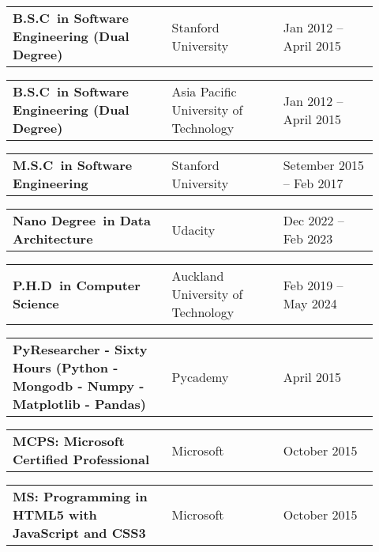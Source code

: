 \documentclass[10pt,a4paper,ragged2e,withhyper]{altacv}
\renewcommand{\cvevent}[4]{%
  \textbf{#1} %
  \hfill %
  \begin{minipage}[t]{.5\linewidth}
    \raggedleft %
    \small#3 %
    \\ %
    #4 %
  \end{minipage}
  \vspace{\baselineskip} %
}
\begin{document}
\vspace{0.5cm}


\renewcommand{\cvevent}[4]{%
  \noindent
  \begin{tabular}{@{}p{0.4\linewidth}p{0.28\linewidth}p{0.2433\linewidth}@{}}
    \small\textbf{#1} & %
    \small{#2} & %
    \raggedleft\arraybackslash\small{#3} %
  \end{tabular}
  \par %
  \vspace{0.5em} %
}








\cvevent{B.S.C\ in Software Engineering (Dual Degree)}{Stanford University}{Jan 2012 -- April 2015}{}

\divider

\cvevent{B.S.C\ in Software Engineering (Dual Degree)}{Asia Pacific University of Technology}{Jan 2012 -- April 2015}{}

\divider

\cvevent{M.S.C\ in Software Engineering}{Stanford University}{Setember 2015 -- Feb 2017}{}

\divider

\cvevent{Nano Degree\ in Data Architecture}{Udacity}{Dec 2022 -- Feb 2023}{}

\divider

\cvevent{P.H.D\ in Computer Science}{Auckland University of Technology}{Feb 2019 -- May 2024}{}

\vspace{0.5cm}


\cvevent{PyResearcher - Sixty Hours (Python - Mongodb - Numpy - Matplotlib - Pandas)}{Pycademy}{April 2015}{}

\divider

\cvevent{MCPS: Microsoft Certified Professional}{Microsoft}{October 2015}{}

\divider

\cvevent{MS: Programming in HTML5 with JavaScript and CSS3}{Microsoft}{October 2015}{}



\vspace{0.5cm}

\end{document}
